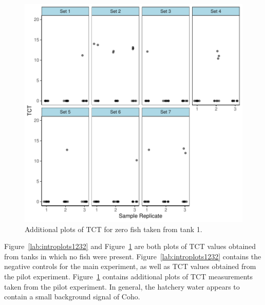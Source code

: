 \begin{figure}[H]
\includegraphics{Chapter3Images/gz3.pdf}
\begin{center}
\caption{Additional plots of TCT for zero fish taken from tank 1. }
\label{lab:introplots123222}
\end{center}
\end{figure}





Figure~\ref{lab:introplots1232} and Figure~\ref{lab:introplots123222} are both plots of TCT values obtained from tanks in which no fish were present. Figure~\ref{lab:introplots1232} contains the negative controls for the main experiment, as well as TCT values obtained from the pilot experiment. Figure~\ref{lab:introplots123222} contains additional plots of TCT measurements taken from the pilot experiment. In general, the hatchery water appears to contain a small background signal of Coho. 